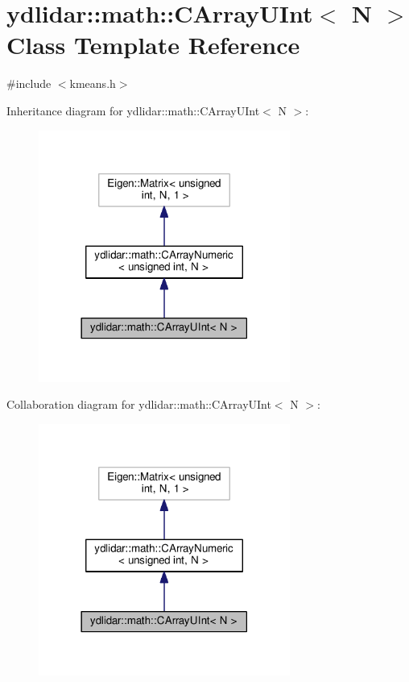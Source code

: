\hypertarget{classydlidar_1_1math_1_1_c_array_u_int}{}\section{ydlidar\+:\+:math\+:\+:C\+Array\+U\+Int$<$ N $>$ Class Template Reference}
\label{classydlidar_1_1math_1_1_c_array_u_int}


{\ttfamily \#include $<$kmeans.\+h$>$}



Inheritance diagram for ydlidar\+:\+:math\+:\+:C\+Array\+U\+Int$<$ N $>$\+:\nopagebreak
\begin{figure}[H]
\begin{center}
\leavevmode
\includegraphics[width=234pt]{classydlidar_1_1math_1_1_c_array_u_int__inherit__graph}
\end{center}
\end{figure}


Collaboration diagram for ydlidar\+:\+:math\+:\+:C\+Array\+U\+Int$<$ N $>$\+:\nopagebreak
\begin{figure}[H]
\begin{center}
\leavevmode
\includegraphics[width=234pt]{classydlidar_1_1math_1_1_c_array_u_int__coll__graph}
\end{center}
\end{figure}
